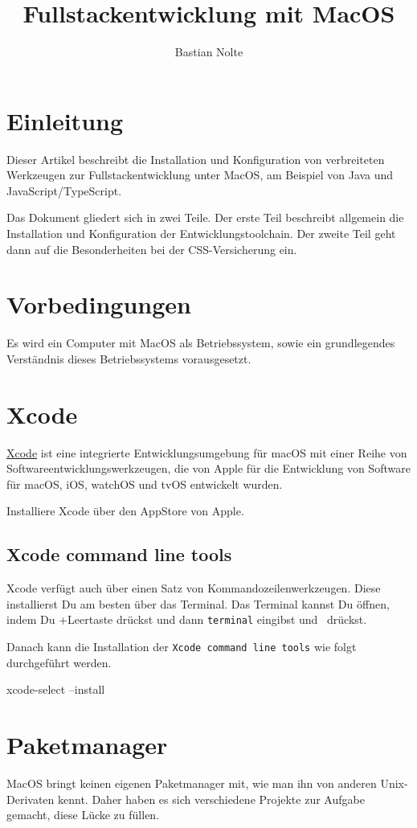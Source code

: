 \documentclass[]{article}
\title{Fullstackentwicklung mit MacOS}
\author{Bastian Nolte}
\newcommand{\code}[1]{\texttt{#1}}
\begin{document}
\maketitle
\section{Einleitung}
Dieser Artikel beschreibt die Installation und Konfiguration von verbreiteten Werkzeugen zur Fullstackentwicklung unter MacOS, am Beispiel von Java und JavaScript/TypeScript.

Das Dokument gliedert sich in zwei Teile. Der erste Teil beschreibt allgemein die Installation und Konfiguration der Entwicklungstoolchain. Der zweite Teil geht dann auf die Besonderheiten bei der CSS-Versicherung ein.

\section{Vorbedingungen}
Es wird ein Computer mit MacOS als Betriebssystem, sowie ein grundlegendes Verständnis dieses Betriebssystems vorausgesetzt.

\section{Xcode}
\href{https://developer.apple.com/xcode/}{Xcode} ist eine integrierte Entwicklungsumgebung für macOS mit einer Reihe von Softwareentwicklungswerkzeugen, die von Apple für die Entwicklung von Software für macOS, iOS, watchOS und tvOS entwickelt wurden.

Installiere Xcode über den AppStore von Apple.
\subsection{Xcode command line tools}
Xcode verfügt auch über einen Satz von Kommandozeilenwerkzeugen. Diese installierst Du am besten über das Terminal. Das Terminal kannst Du öffnen, indem Du \cmdkey+Leertaste drückst und dann \code{terminal} eingibst und \returnkey\, drückst.

Danach kann die Installation der \code{Xcode  command line tools} wie folgt durchgeführt werden.
\begin{bashcode}
xcode-select --install
\end{bashcode}

\section{Paketmanager}
MacOS bringt keinen eigenen Paketmanager mit, wie man ihn von anderen Unix-Derivaten kennt. Daher haben es sich verschiedene Projekte zur Aufgabe gemacht, diese Lücke zu füllen.
\end{document}
